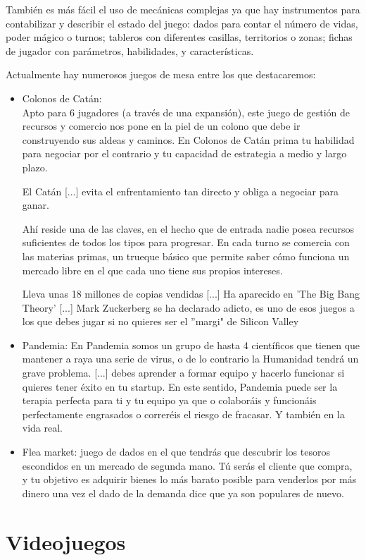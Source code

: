 También es más fácil el uso de mecánicas complejas ya que hay instrumentos para contabilizar y describir el estado del juego: dados para contar el número de vidas, poder mágico o turnos; tableros con diferentes casillas, territorios o zonas; fichas de jugador con parámetros, habilidades, y características.

Actualmente hay numerosos juegos de mesa entre los que destacaremos:
\begin{itemize}
         \item Colonos de Catán: \\

Apto para 6 jugadores (a través de una expansión), este juego de gestión de recursos y comercio nos pone en la piel de un colono que debe ir construyendo sus aldeas y caminos. En Colonos de Catán prima tu habilidad para negociar por el contrario y tu capacidad de estrategia a medio y largo plazo. \cite{faceentrepreneurship2016}

El Catán [...] evita el enfrentamiento tan directo y obliga a negociar para ganar.

Ahí reside una de las claves, en el hecho que de entrada nadie posea recursos suficientes de todos los tipos para progresar. En cada turno se comercia con las materias primas, un trueque básico que permite saber cómo funciona un mercado libre en el que cada uno tiene sus propios intereses. \cite{albertini2015}

Lleva unas 18 millones de copias vendidas [...] Ha aparecido en 'The Big Bang Theory' [...] Mark Zuckerberg se ha declarado adicto, es uno de esos juegos a los que debes jugar si no quieres ser el ''margi" de Silicon Valley \cite{albertini2015}

         \item Pandemia: 
En Pandemia somos un grupo de hasta 4 científicos que tienen que mantener a raya una serie de virus, o de lo contrario la Humanidad tendrá un grave problema. [...] debes aprender a formar equipo y hacerlo funcionar si quieres tener éxito en tu startup. En este sentido, Pandemia puede ser la terapia perfecta para ti y tu equipo ya que o colaboráis y funcionáis perfectamente engrasados o correréis el riesgo de fracasar. Y también en la vida real. \cite{faceentrepreneurship2016}

         \item Flea market:
juego de dados en el que tendrás que descubrir los tesoros escondidos en un mercado de segunda mano. Tú serás el cliente que compra, y tu objetivo es adquirir bienes lo más barato posible para venderlos por más dinero una vez el dado de la demanda dice que ya son populares de nuevo. \cite{mariagonzalez2015}
\end{itemize}


\section{Videojuegos}
